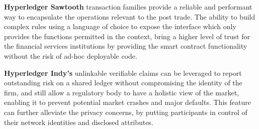\textbf{Hyperledger Sawtooth} transaction families provide a reliable and performant way to encapsulate the operations relevant to the post trade. The ability to build complex rules using a language of choice to expose the interface which only provides the functions permitted in the context, bring a higher level of trust for the financial services institutions by providing the smart contract functionality without the risk of ad-hoc deployable code.

\textbf{Hyperledger Indy's} unlinkable verifiable claims can be leveraged to report outstanding risk on a shared ledger without compromising the identity of the firm, and still allow a regulatory body to have a holistic view of the market, enabling it to prevent potential market crashes and major defaults. This feature can further alleviate the privacy concerns, by putting participants in control of their network identities and disclosed attributes.
